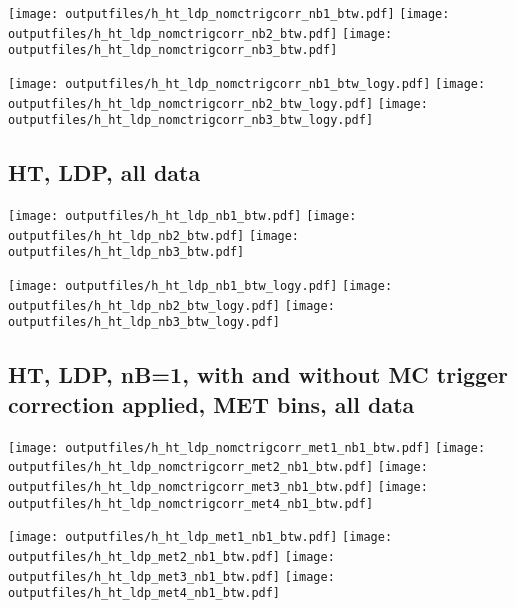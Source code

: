 \documentclass[11pt]{article}
\begin{document}
    \noindent
     \texttt{[image: outputfiles/h\_ht\_ldp\_nomctrigcorr\_nb1\_btw.pdf]}
     \texttt{[image: outputfiles/h\_ht\_ldp\_nomctrigcorr\_nb2\_btw.pdf]}
     \texttt{[image: outputfiles/h\_ht\_ldp\_nomctrigcorr\_nb3\_btw.pdf]}

    \noindent
     \texttt{[image: outputfiles/h\_ht\_ldp\_nomctrigcorr\_nb1\_btw\_logy.pdf]}
     \texttt{[image: outputfiles/h\_ht\_ldp\_nomctrigcorr\_nb2\_btw\_logy.pdf]}
     \texttt{[image: outputfiles/h\_ht\_ldp\_nomctrigcorr\_nb3\_btw\_logy.pdf]}


    \subsection{ HT, LDP, all data}

    \noindent
     \texttt{[image: outputfiles/h\_ht\_ldp\_nb1\_btw.pdf]}
     \texttt{[image: outputfiles/h\_ht\_ldp\_nb2\_btw.pdf]}
     \texttt{[image: outputfiles/h\_ht\_ldp\_nb3\_btw.pdf]}

    \noindent
     \texttt{[image: outputfiles/h\_ht\_ldp\_nb1\_btw\_logy.pdf]}
     \texttt{[image: outputfiles/h\_ht\_ldp\_nb2\_btw\_logy.pdf]}
     \texttt{[image: outputfiles/h\_ht\_ldp\_nb3\_btw\_logy.pdf]}

     \subsection{ HT, LDP, nB=1, with and without MC trigger correction applied, MET bins, all data}

    \noindent
     \texttt{[image: outputfiles/h\_ht\_ldp\_nomctrigcorr\_met1\_nb1\_btw.pdf]}
     \texttt{[image: outputfiles/h\_ht\_ldp\_nomctrigcorr\_met2\_nb1\_btw.pdf]}
     \texttt{[image: outputfiles/h\_ht\_ldp\_nomctrigcorr\_met3\_nb1\_btw.pdf]}
     \texttt{[image: outputfiles/h\_ht\_ldp\_nomctrigcorr\_met4\_nb1\_btw.pdf]}

    \noindent
     \texttt{[image: outputfiles/h\_ht\_ldp\_met1\_nb1\_btw.pdf]}
     \texttt{[image: outputfiles/h\_ht\_ldp\_met2\_nb1\_btw.pdf]}
     \texttt{[image: outputfiles/h\_ht\_ldp\_met3\_nb1\_btw.pdf]}
     \texttt{[image: outputfiles/h\_ht\_ldp\_met4\_nb1\_btw.pdf]}
\end{document}
